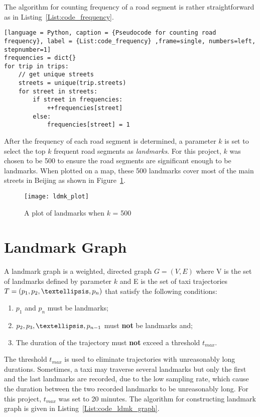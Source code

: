 The algorithm for counting frequency of a road segment is rather straightforward as in Listing~\ref{List:code_frequency}.

\begin{lstlisting}[language = Python, caption = {Pseudocode for counting road frequency}, label = {List:code_frequency} ,frame=single, numbers=left, stepnumber=1]
frequencies = dict{}
for trip in trips:
 	// get unique streets
	streets = unique(trip.streets)
	for street in streets:
		if street in frequencies:
			++frequencies[street]
		else:
			frequencies[street] = 1
\end{lstlisting}

After the frequency of each road segment is determined, a parameter $k$ is set to select the top $k$ frequent road segments as \emph{landmarks}. For this project, $k$ was chosen to be 500 to ensure the road segments are significant enough to be landmarks. When plotted on a map, these 500 landmarks cover most of the main streets in Beijing as shown in Figure~\ref{Fig:ldmk_500}. 

\begin{figure}[h]
\texttt{[image: ldmk\_plot]}
\centering
\caption{A plot of landmarks when $k$ = 500}\label{Fig:ldmk_500}
\end{figure}

\section{Landmark Graph}\label{ldmk_graph}
\begin{defn}\label{Def:ldmk_graph}
A landmark graph is a weighted, directed graph $G=(V,E)$ where V is the set of landmarks defined by parameter $k$ and E is the set of taxi trajectories $T = (p_1,p_2,\textellipsis,p_n)$ that satisfy the following conditions:
\begin{enumerate}
\item $p_1$ and $p_n$ must be landmarks; 
\item $p_2, p_3, \textellipsis , p_{n-1}$ must \textbf{not} be landmarks and;
\item The duration of the trajectory must \textbf{not} exceed a threshold $t_{max}$.
\end{enumerate}
\end{defn}

The threshold $t_{max}$ is used to eliminate trajectories with unreasonably long du\-rations\cite{TDR10}. Sometimes, a taxi may traverse several landmarks but only the first and the last landmarks are recorded, due to the low sampling rate, which cause the duration between the two recorded landmarks to be unreasonably long. For this project, $t_{max}$ was set to 20 minutes. The algorithm for constructing landmark graph is given in Listing~\ref{List:code_ldmk_graph}.

